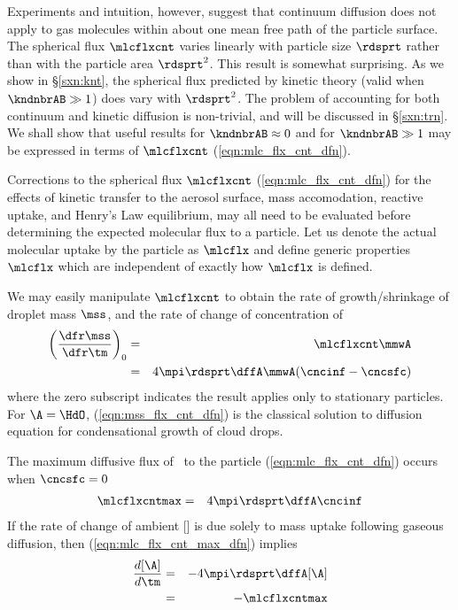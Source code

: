\documentclass[12pt,twoside]{book}
\begin{document}
Experiments and intuition, however, suggest that continuum diffusion
does not apply to gas molecules within about one mean free path of the
particle surface. 
The spherical flux $\mlcflxcnt$ varies linearly with particle size
$\rdsprt$ rather than with the particle area $\rdsprt^{2}$.
This result is somewhat surprising.
As we show in \S\ref{sxn:knt}, the spherical flux predicted by kinetic 
theory (valid when $\kndnbrAB \gg 1$) does vary with $\rdsprt^{2}$.
The problem of accounting for both continuum and kinetic diffusion is
non-trivial, and will be discussed in \S\ref{sxn:trn}.  
We shall show that useful results for $\kndnbrAB \approx 0$ and for
$\kndnbrAB \gg 1$ may be expressed in terms of $\mlcflxcnt$
(\ref{eqn:mlc_flx_cnt_dfn}). 
 
Corrections to the spherical flux $\mlcflxcnt$
(\ref{eqn:mlc_flx_cnt_dfn}) for the effects of kinetic transfer to the 
aerosol surface, mass accomodation, reactive uptake, and Henry's Law 
equilibrium, may all need to be evaluated before determining the
expected molecular flux to a particle.
Let us denote the actual molecular uptake by the particle as $\mlcflx$ 
and define generic properties $\mlcflx$ which are independent of
exactly how $\mlcflx$ is defined.

We may easily manipulate $\mlcflxcnt$ to obtain the rate of
growth/shrinkage of droplet mass $\mss$, and the rate of change of 
concentration of \A\
\begin{eqnarray}
\left( \frac{\dfr\mss}{\dfr\tm } \right)_{0} & = & \mlcflxcnt \mmwA \nonumber \\
& = & 4 \mpi \rdsprt \dffA \mmwA ( \cncinf - \cncsfc )
\label{eqn:mss_flx_cnt_dfn}
\end{eqnarray}
where the zero subscript indicates the result applies only to
stationary particles. 
For $\A = \HdO$, (\ref{eqn:mss_flx_cnt_dfn}) is the classical solution
to diffusion equation for condensational growth of cloud drops. 

The maximum diffusive flux of \A\ to the particle
(\ref{eqn:mlc_flx_cnt_dfn}) occurs when $\cncsfc = 0$ 
\begin{eqnarray}
\mlcflxcntmax & = & 4 \mpi \rdsprt \dffA \cncinf
\label{eqn:mlc_flx_cnt_max_dfn}
\end{eqnarray}
If the rate of change of ambient [\A] is due solely to mass uptake
following gaseous diffusion, then (\ref{eqn:mlc_flx_cnt_max_dfn})
implies 
\begin{eqnarray}
\frac{d [\A]}{d \tm } & = & - 4 \mpi \rdsprt \dffA [\A] \\
& = & - \mlcflxcntmax
\label{eqn:snk_cnt_A}
\end{eqnarray}
\end{document}
